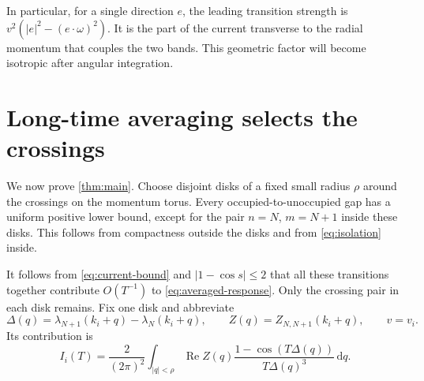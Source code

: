\documentclass[11pt,a4paper]{article}
\newcommand{\dd}{\,\mathrm d}
\DeclareMathOperator{\Rea}{Re}
\theoremstyle{remark}
\numberwithin{equation}{section}
\begin{document}
In particular, for a single direction $e$, the leading transition
strength is $v^2(|e|^2-(e\cdot\omega)^2)$. It is the part of the current
transverse to the radial momentum that couples the two bands. This
geometric factor will become isotropic after angular integration.

\section{Long-time averaging selects the crossings}
\label{sec:limit}

We now prove \cref{thm:main}. Choose disjoint disks of a fixed small
radius $\rho$ around the crossings on the momentum torus.
Every occupied-to-unoccupied gap has a uniform positive lower bound,
except for the pair $n=N$, $m=N+1$ inside these disks. This follows
from compactness outside the disks and from \eqref{eq:isolation} inside.

It follows from \eqref{eq:current-bound} and $|1-\cos s|\leq2$ that
all these transitions together contribute $O(T^{-1})$ to
\eqref{eq:averaged-response}. Only the crossing pair in each disk
remains. Fix one disk and abbreviate
\[
 \Delta(q)=\lambda_{N+1}(k_i+q)-\lambda_N(k_i+q),\qquad
 Z(q)=Z_{N,N+1}(k_i+q),\qquad v=v_i.
\]
Its contribution is
\begin{equation}
 I_i(T)=\frac{2}{(2\pi)^2}
 \int_{|q|<\rho}\Rea Z(q)
       \frac{1-\cos(T\Delta(q))}{T\Delta(q)^3}\dd q.
 \label{eq:one-cone}
\end{equation}
\end{document}
